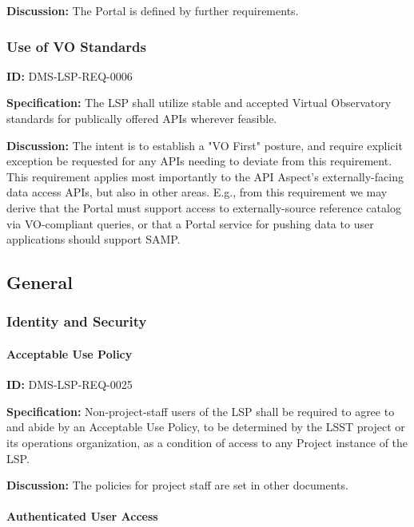\documentclass[SE,toc,lsstdraft]{lsstdoc}
\begin{document}
\textbf{Discussion:}
The Portal is defined by further requirements.

\subsubsection{Use of VO Standards}

\label{DMS-LSP-REQ-0006}
\textbf{ID:} DMS-LSP-REQ-0006

\textbf{Specification:}
The LSP shall utilize stable and accepted Virtual Observatory standards for publically offered APIs wherever feasible.

\textbf{Discussion:}
The intent is to establish a "VO First" posture, and require explicit exception be requested for any APIs needing to deviate from this requirement.
This requirement applies most importantly to the API Aspect's externally-facing data access APIs, but also in other areas.
E.g., from this requirement we may derive that the Portal must support access to externally-source reference catalog via VO-compliant queries, or that a Portal service for pushing data to user applications should support SAMP.

\subsection{General}

\subsubsection{Identity and Security}

\paragraph{Acceptable Use Policy}\hfill  %

\label{DMS-LSP-REQ-0025}
\textbf{ID:} DMS-LSP-REQ-0025

\textbf{Specification:}
Non-project-staff users of the LSP shall be required to agree to and abide by an Acceptable Use Policy, to be determined by the LSST project or its operations organization, as a condition of access to any Project instance of the LSP.

\textbf{Discussion:}
The policies for project staff are set in other documents.

\paragraph{Authenticated User Access}\hfill  %
\end{document}
